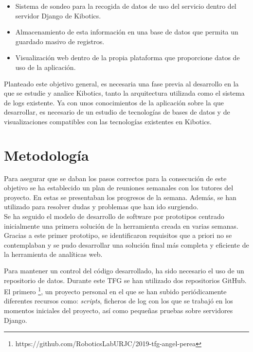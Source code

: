\documentclass[a4paper, 12pt]{book}
\begin{document}
		\begin{itemize}
			\item Sistema de sondeo para la recogida de datos de uso del servicio dentro del servidor Django de Kibotics.
			\item Almacenamiento de esta información en una base de datos que permita un guardado masivo de registros.
			\item Visualización web dentro de la propia plataforma que proporcione datos de uso de la aplicación.
		\end{itemize}
	
		Planteado este objetivo general, es necesaria una fase previa al desarrollo en la que se estudie y analice Kibotics, tanto la arquitectura utilizada como el sistema de logs existente. Ya con unos conocimientos de la aplicación sobre la que desarrollar, es necesario de un estudio de tecnologías de bases de datos y de visualizaciones compatibles con las tecnologías existentes en Kibotics. \\
			
		
	\section{Metodología}
	\label{sec:metodologia}
				
		Para asegurar que se daban los pasos correctos para la consecución de este objetivo se ha establecido un plan de reuniones semanales con los tutores del proyecto. En estas se presentaban los progresos de la semana. Además, se han utilizado para resolver dudas y problemas que han ido surgiendo.\\
		
		Se ha seguido el modelo de desarrollo de software por prototipos centrado inicialmente una primera solución de la herramienta creada en varias semanas. Gracias a este primer prototipo, se identificaron requisitos que a priori no se contemplaban y se pudo desarrollar una solución final más completa y eficiente de la herramienta de analíticas web.
		
		Para mantener un control del código desarrollado, ha sido necesario el uso de un repositorio de datos. Durante este TFG se han utilizado dos repositorios GitHub. El primero \footnote{https://github.com/RoboticsLabURJC/2019-tfg-angel-perea}, un proyecto personal en el que se han subido periódicamente diferentes recursos como: \textit{scripts}, ficheros de log con los que se trabajó en los momentos iniciales del proyecto, así como pequeñas pruebas sobre servidores Django. \\
		
\end{document}
